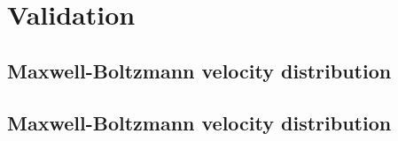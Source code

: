 \section{Validation}
\subsection{Maxwell-Boltzmann velocity distribution}
\subsection{Maxwell-Boltzmann velocity distribution}